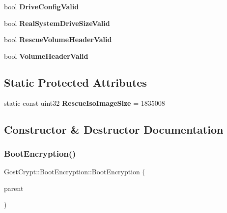 \begin{DoxyCompactItemize}
bool {\bfseries Drive\+Config\+Valid}
\item 
\mbox{\label{class_gost_crypt_1_1_boot_encryption_a31ddce505b2f01ee66f893091ff916d8}} 
bool {\bfseries Real\+System\+Drive\+Size\+Valid}
\item 
\mbox{\label{class_gost_crypt_1_1_boot_encryption_aac8bc4712df432e4dbbedfd6fe177ae1}} 
bool {\bfseries Rescue\+Volume\+Header\+Valid}
\item 
\mbox{\label{class_gost_crypt_1_1_boot_encryption_a57b8fe9d7724b15565cf5aeb720823ab}} 
bool {\bfseries Volume\+Header\+Valid}
\end{DoxyCompactItemize}
\subsection*{Static Protected Attributes}
\begin{DoxyCompactItemize}
\item 
\mbox{\label{class_gost_crypt_1_1_boot_encryption_ac01638d345f192eb21a7ebf421031149}} 
static const uint32 {\bfseries Rescue\+Iso\+Image\+Size} = 1835008
\end{DoxyCompactItemize}


\subsection{Constructor \& Destructor Documentation}
\mbox{\label{class_gost_crypt_1_1_boot_encryption_a4306025352fbfc8db0d572a0b21b64ff}} 
\subsubsection{\texorpdfstring{Boot\+Encryption()}{BootEncryption()}}
{\footnotesize\ttfamily Gost\+Crypt\+::\+Boot\+Encryption\+::\+Boot\+Encryption (\begin{DoxyParamCaption}\item[{H\+W\+ND}]{parent }\end{DoxyParamCaption})}



